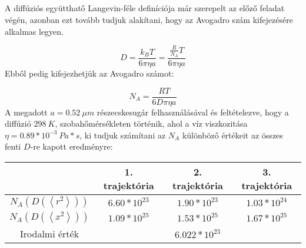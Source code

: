 \section{} \label{sec:3}
\\ \\
A diffúziós együtthatő Langevin-féle definíciója már szerepelt az előző feladat végén, azonban ezt tovább tudjuk alakítani, hogy az Avogadro szám kifejezésére alkalmas legyen.

\begin{equation} \label{eq:18}
    D
    =
    \frac{k_{B} T}{6 \pi \eta a}
    =
    \frac{\tfrac{R}{N_{A}} T}{6 \pi \eta a}
\end{equation}
Ebből pedig kifejezhetjük az Avogadro számot:

\begin{equation} \label{eq:19}
    N_{A} = \frac{R T}{6 D \pi \eta a}
\end{equation}
A megadott $a = 0.52\ \mu m$ részecskesugár felhasználásával és feltételezve, hogy a diffúzió $298\ K$, szobahőmérsékleten történik, ahol a víz viszkozitása $\eta = 0.89 * 10^{-3}\ Pa*s$, ki tudjuk számítani az $N_{A}$ különböző értékeit az összes fenti $D$-re kapott eredményre:

\begin{center}
\label{tab:7}
\begin{tabular}{||c|c|c|c||}
    \toprule
                                                                  & 1. trajektória  & 2. trajektória  & 3. trajektória  \\ \hline \hline
    $N_{A} \left( D \left( \left< r^{2} \right> \right) \right)$  & $6.60*10^{23}$  & $1.90*10^{23}$  & $1.03*10^{24}$ \\ \hline
    $N_{A} \left( D \left( \left< x^{2} \right> \right) \right)$  & $1.09*10^{25}$  & $1.53*10^{25}$  & $1.67*10^{25}$ \\ \hline
    Irodalmi érték                                                & \multicolumn{3}{c||}{$6.022*10^{23}$} \\
    \bottomrule
\end{tabular}
\end{center}

